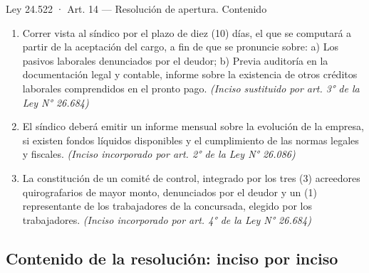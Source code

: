 \documentclass[12pt,oneside]{book}
\begin{document}
\begin{norma}{Ley 24.522 · Art. 14 — Resolución de apertura. Contenido}
\begin{enumerate}[label=\arabic*),leftmargin=*]
    \item Correr vista al síndico por el plazo de diez (10) días, el que se computará a partir de la aceptación del cargo, a fin de que se pronuncie sobre: a) Los pasivos laborales denunciados por el deudor; b) Previa auditoría en la documentación legal y contable, informe sobre la existencia de otros créditos laborales comprendidos en el pronto pago. \textit{(Inciso sustituido por art. 3° de la Ley N° 26.684)}
    \item El síndico deberá emitir un informe mensual sobre la evolución de la empresa, si existen fondos líquidos disponibles y el cumplimiento de las normas legales y fiscales. \textit{(Inciso incorporado por art. 2° de la Ley N° 26.086)}
    \item La constitución de un comité de control, integrado por los tres (3) acreedores quirografarios de mayor monto, denunciados por el deudor y un (1) representante de los trabajadores de la concursada, elegido por los trabajadores. \textit{(Inciso incorporado por art. 4° de la Ley N° 26.684)}
\end{enumerate}
\end{norma}

\subsection{Contenido de la resolución: inciso por inciso}
\end{document}
